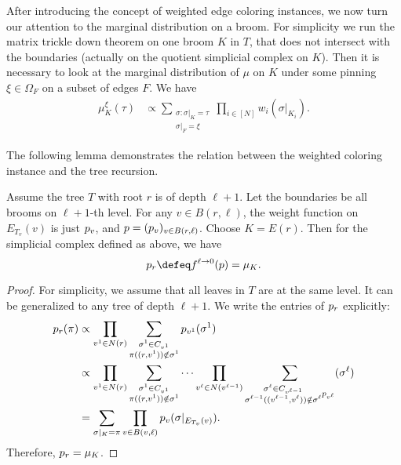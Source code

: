 \documentclass[a4paper,11pt]{article}
\begin{document}
After introducing the concept of weighted edge coloring instances, we now turn our attention to the marginal distribution on a broom. For simplicity we run the matrix trickle down theorem on one broom $K$ in $T$,
that does not intersect with the boundaries
(actually on the quotient simplicial complex on $K$).
Then it is necessary to look at the marginal distribution of $\mu$
on $K$ under some pinning $\xi \in \Omega_F$ on a subset of edges $F$.
We have
\begin{align}\label{eq:broom-marginal-1}
\mu^\xi_K(\tau)
&\propto \sum_{\substack{\sigma:\sigma|_K=\tau \\ \sigma|_F=\xi}}
 \prod_{i\in [N]} w_i(\sigma|_{K_i}).
\end{align}

The following lemma demonstrates the relation between the weighted coloring instance and the tree recursion.
\begin{lemma}\label{lem:p=mu}
    Assume the tree $T$ with root $r$ is of depth $\ell+1$. Let the boundaries be all brooms on $\ell+1$-th level.
    For any $v\in B(r,\ell)$, the weight function on $E_{T_v}(v)$ is just $\*p_v$, and $\*p=(\*p_v)_{v\in B(r,\ell)}$. Choose $K=E(r)$. Then for the simplicial complex defined as above, we have  \[\*p_r\defeq  f^{\ell\rightarrow 0}(\*p)= \mu_K .\]
\end{lemma}
\begin{proof} 
    For simplicity, we assume that all leaves in $T$ are at the same level. It can be generalized to any tree of depth $\ell+1$. We write the entries of $\*p_r$ explicitly:
    \begin{align*} 
    \*p_r(\pi) &\propto \prod_{v^1\in N(r)} \sum_{\substack{\sigma^1 \in  C_{v^1}\\\pi((r,v^1))\notin \sigma^1}} \*p_{v^1}(\sigma^1)\\
    &\propto \prod_{v^1\in N(r)}
    \sum_{\substack{\sigma^1 \in C_{v^1}\\\pi((r,v^1))\notin \sigma^1}} \cdots
    \prod_{v^\ell\in N(v^{\ell-1})}
    \sum_{\substack{\sigma^\ell \in C_{v^{\ell-1}}\\\sigma^{\ell-1}((v^{\ell-1},v^\ell))\notin \sigma^\ell} \*p_{v^\ell}}(\sigma^\ell)\\
    & = \sum_{\sigma|_K=\pi}\prod_{v \in B(v,\ell)} \*p_v(\sigma|_{E_{T_v}(v)}).
    \end{align*}
    Therefore, $\*p_r = \mu_K$.
\end{proof}
\end{document}
